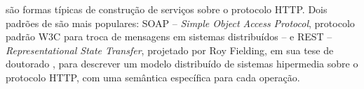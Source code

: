 % 
% 
% 
% 
% 


\wss{} são formas típicas de construção de serviços sobre o protocolo HTTP.
Dois padrões de \wss{} são mais populares: SOAP -- \textit{Simple Object Access
Protocol}, protocolo padrão W3C para troca de mensagens em sistemas
distribuídos -- e REST -- \textit{Representational State Transfer}, projetado
por Roy Fielding, em sua tese de doutorado \cite{fielding2000architectural}, para descrever um modelo distribuído de sistemas hipermedia sobre o protocolo HTTP, com uma semântica
específica para cada operação.

